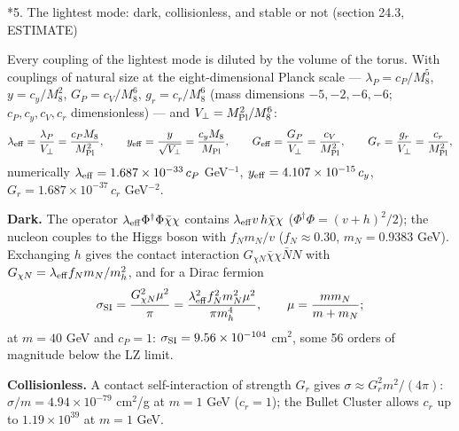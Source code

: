 \documentclass[10pt,a4paper]{article}
\makeatletter
\renewcommand\section{\@startsection{section}{1}{\z@}{-3.5ex \@plus -1ex \@minus -.2ex}{2.3ex \@plus.2ex}{\normalfont\Large\bfseries\raggedright}}
\makeatother
\begin{document}
\section*{5. The lightest mode: dark, collisionless, and stable or not (section 24.3, ESTIMATE)}
Every coupling of the lightest mode is diluted by the volume of the torus. With couplings of natural size at the eight-dimensional Planck scale — $\lambda_P=c_P/M_8^5$, $y=c_y/M_8^2$, $G_P=c_V/M_8^6$, $g_r=c_r/M_8^6$ (mass dimensions $-5,-2,-6,-6$; $c_P,c_y,c_V,c_r$ dimensionless) — and $V_\perp=M_{\rm Pl}^2/M_8^6$:
\begin{equation*}
\lambda_{\rm eff}=\frac{\lambda_P}{V_\perp}=\frac{c_PM_8}{M_{\rm Pl}^2},\qquad y_{\rm eff}=\frac{y}{\sqrt{V_\perp}}=\frac{c_yM_8}{M_{\rm Pl}},\qquad G_{\rm eff}=\frac{G_P}{V_\perp}=\frac{c_V}{M_{\rm Pl}^2},\qquad G_r=\frac{g_r}{V_\perp}=\frac{c_r}{M_{\rm Pl}^2},
\end{equation*}
numerically $\lambda_{\rm eff}=1.687\times10^{-33}\,c_P$ GeV$^{-1}$, $y_{\rm eff}=4.107\times10^{-15}\,c_y$, $G_r=1.687\times10^{-37}\,c_r$ GeV$^{-2}$.

\textbf{Dark.} The operator $\lambda_{\rm eff}\Phi^\dagger\Phi\bar\chi\chi$ contains $\lambda_{\rm eff}v\,h\bar\chi\chi$ ($\Phi^\dagger\Phi=(v+h)^2/2$); the nucleon couples to the Higgs boson with $f_Nm_N/v$ ($f_N\approx0.30$, $m_N=0.9383$ GeV). Exchanging $h$ gives the contact interaction $G_{\chi N}\bar\chi\chi\bar NN$ with $G_{\chi N}=\lambda_{\rm eff}f_Nm_N/m_h^2$, and for a Dirac fermion
\begin{equation*}
\sigma_{\rm SI}=\frac{G_{\chi N}^2\mu^2}{\pi}=\frac{\lambda_{\rm eff}^2f_N^2m_N^2\mu^2}{\pi m_h^4},\qquad \mu=\frac{mm_N}{m+m_N};
\end{equation*}
at $m=40$ GeV and $c_P=1$: $\sigma_{\rm SI}=9.56\times10^{-104}$ cm$^2$, some 56 orders of magnitude below the LZ limit.

\textbf{Collisionless.} A contact self-interaction of strength $G_r$ gives $\sigma\approx G_r^2m^2/(4\pi)$: $\sigma/m=4.94\times10^{-79}$ cm$^2$/g at $m=1$ GeV ($c_r=1$); the Bullet Cluster allows $c_r$ up to $1.19\times10^{39}$ at $m=1$ GeV.
\end{document}
